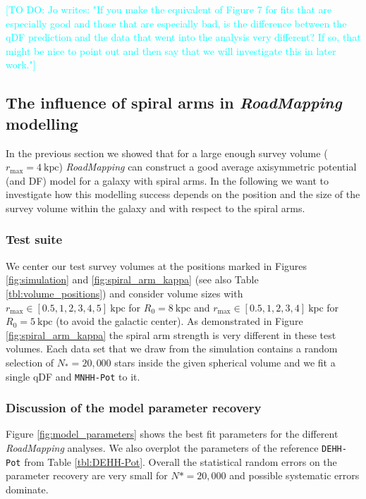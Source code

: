 \documentclass[iop,revtex4,numberedappendix,appendixfloats]{emulateapj}
\newcommand{\RM}{{\sl RoadMapping}}
\newcommand{\Jo}[1]{\textcolor{Cyan}{#1}}
\begin{document}
\Jo{[TO DO: Jo writes: "If you make the equivalent of Figure 7 for fits that are especially good and those that are especially bad, is the difference between the qDF prediction and the data that went into the analysis very different? If so, that might be nice to point out and then say that we will investigate this in later work."]}

\subsection{The influence of spiral arms in \RM{} modelling} \label{sec:results_part2}

In the previous section we showed that for a large enough survey volume ($r_\text{max}=4~\text{kpc}$) \RM{} can construct a good average axisymmetric potential (and DF) model for a galaxy with spiral arms. In the following we want to investigate how this modelling success depends on the position and the size of the survey volume within the galaxy and with respect to the spiral arms.

\subsubsection{Test suite} \label{sec:suite}

We center our test survey volumes at the positions marked in Figures \ref{fig:simulation} and \ref{fig:spiral_arm_kappa} (see also Table \ref{tbl:volume_positions}) and consider volume sizes with $r_\text{max} \in [0.5,1,2,3,4,5]~\text{kpc}$ for $R_0 = 8~\text{kpc}$ and $r_\text{max} \in [0.5,1,2,3,4]~\text{kpc}$ for $R_0 = 5~\text{kpc}$ (to avoid the galactic center). As demonstrated in Figure \ref{fig:spiral_arm_kappa} the spiral arm strength is very different in these test volumes. Each data set that we draw from the simulation contains a random selection of $N_*=20,000$ stars inside the given spherical volume and we fit a single qDF and \texttt{MNHH-Pot} to it. 

\subsubsection{Discussion of the model parameter recovery} \label{sec:parameter recovery}

Figure \ref{fig:model_parameters} shows the best fit parameters for the different \RM{} analyses. We also overplot the parameters of the reference \texttt{DEHH-Pot} from Table \ref{tbl:DEHH-Pot}. Overall the statistical random errors on the parameter recovery are very small for $N*=20,000$ and possible systematic errors dominate. 
\end{document}
